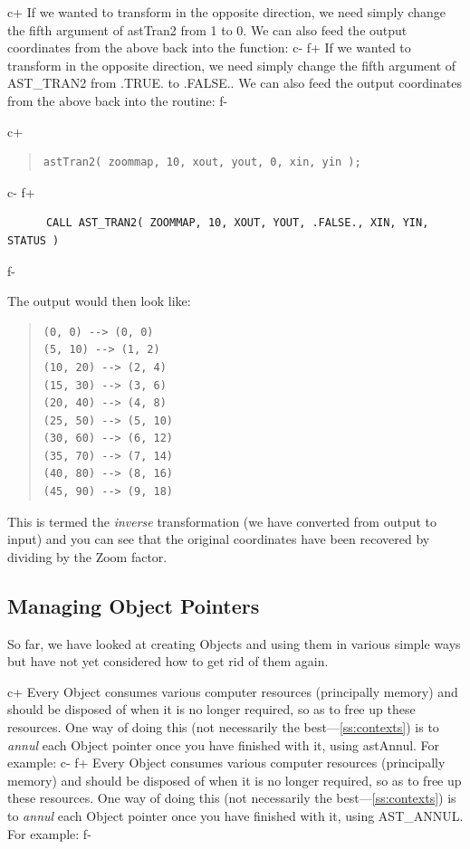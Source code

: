 \documentclass[twoside,11pt]{article}
\newcommand{\secref}[1]{\S\ref{#1}}
\renewcommand{\secref}[1]{\ref{#1}}
\begin{document}
c+
If we wanted to transform in the opposite direction, we need simply
change the fifth argument of astTran2 from 1 to 0. We can also feed
the output coordinates from the above back into the function:
c-
f+
If we wanted to transform in the opposite direction, we need simply
change the fifth argument of AST\_TRAN2 from .TRUE. to .FALSE.. We can
also feed the output coordinates from the above back into the routine:
f-

c+
\begin{quote}
\small
\begin{verbatim}
astTran2( zoommap, 10, xout, yout, 0, xin, yin );
\end{verbatim}
\normalsize
\end{quote}
c-
f+
\small
\begin{verbatim}
      CALL AST_TRAN2( ZOOMMAP, 10, XOUT, YOUT, .FALSE., XIN, YIN, STATUS )
\end{verbatim}
\normalsize
f-

The output would then look like:

\begin{quote}
\small
\begin{verbatim}
(0, 0) --> (0, 0)
(5, 10) --> (1, 2)
(10, 20) --> (2, 4)
(15, 30) --> (3, 6)
(20, 40) --> (4, 8)
(25, 50) --> (5, 10)
(30, 60) --> (6, 12)
(35, 70) --> (7, 14)
(40, 80) --> (8, 16)
(45, 90) --> (9, 18)
\end{verbatim}
\normalsize
\end{quote}

This is termed the {\em{inverse}} transformation (we have converted
from output to input) and you can see that the original coordinates
have been recovered by dividing by the Zoom factor.

\subsection{\label{ss:annullingpointers}Managing Object Pointers}

So far, we have looked at creating Objects and using them in various
simple ways but have not yet considered how to get rid of them again.

c+
Every Object consumes various computer resources (principally memory)
and should be disposed of when it is no longer required, so as to free
up these resources. One way of doing this (not necessarily the
best---\secref{ss:contexts}) is to {\em{annul}} each Object pointer once
you have finished with it, using astAnnul. For example:
c-
f+
Every Object consumes various computer resources (principally memory)
and should be disposed of when it is no longer required, so as to free
up these resources. One way of doing this (not necessarily the
best---\secref{ss:contexts}) is to {\em{annul}} each Object pointer once
you have finished with it, using AST\_ANNUL. For example:
f-
\end{document}
